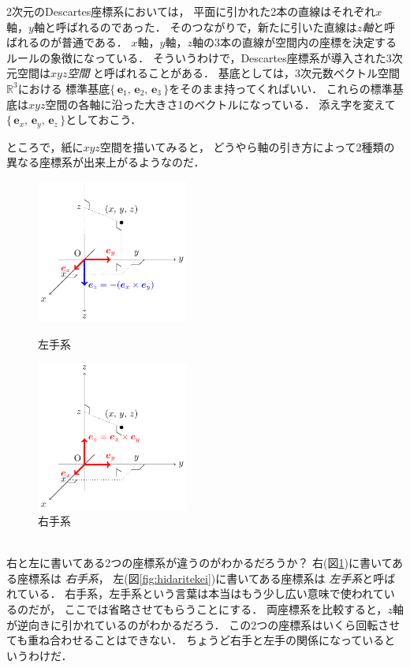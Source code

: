2次元のDescartes座標系においては，
平面に引かれた2本の直線はそれぞれ$x$軸，$y$軸と呼ばれるのであった．
そのつながりで，新たに引いた直線は\emph{$z$軸}と呼ばれるのが普通である．
$x$軸，$y$軸，$z$軸の3本の直線が空間内の座標を決定するルールの象徴になっている．
そういうわけで，Descartes座標系が導入された3次元空間は\emph{$xyz$空間}
と呼ばれることがある．
基底としては，3次元数ベクトル空間$\mathbb{R}^3$における
標準基底$\{ \, \bm{e}_1, \, \bm{e}_2, \, \bm{e}_3 \, \}$をそのまま持ってくればいい．
これらの標準基底は$xyz$空間の各軸に沿った大きさ1のベクトルになっている．
添え字を変えて$\{ \, \bm{e}_x, \, \bm{e}_y, \, \bm{e}_z \, \}$としておこう．

ところで，紙に$xyz$空間を描いてみると，
どうやら軸の引き方によって2種類の異なる座標系が出来上がるようなのだ．
\begin{figure}[h]
 \begin{minipage}{0.5\hsize}
  \begin{center}
   \includegraphics[width=5cm]{picture/vecter16}
  \end{center}
 \caption{左手系}
\label{fig:hidaritekei}
\end{minipage}
\begin{minipage}{0.5\hsize}
  \begin{center}
   \includegraphics[width=5cm]{picture/vecter15}
  \end{center}
 \caption{右手系}
\label{fig:migitekei}
\end{minipage}
\end{figure}
\\
右と左に書いてある2つの座標系が違うのがわかるだろうか？ 右(図\ref{fig:migitekei})に書いてある座標系は
\emph{右手系}，
左(図\ref{fig:hidaritekei})に書いてある座標系は
\emph{左手系}と呼ばれている．
右手系，左手系という言葉は本当はもう少し広い意味で使われているのだが，
ここでは省略させてもらうことにする．
両座標系を比較すると，$z$軸が逆向きに引かれているのがわかるだろう．
この2つの座標系はいくら回転させても重ね合わせることはできない．
ちょうど右手と左手の関係になっているというわけだ．

